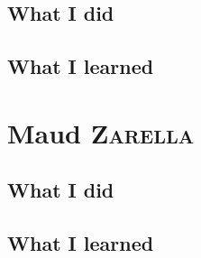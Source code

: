 \documentclass[a4paper,notitlepage]{report}
\newcommand{\authorThree} {Maud   \textsc{Zarella}}
\begin{document}
\subsection{What I did}

\subsection{What I learned}


\section{\authorThree}

\subsection{What I did}

\subsection{What I learned}




\printbibliography
\end{document}
